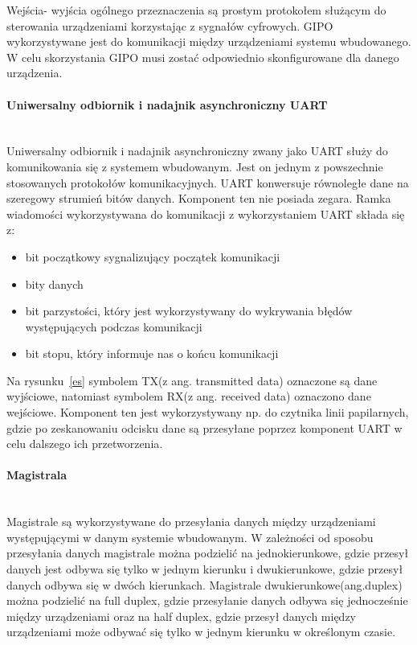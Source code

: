 \documentclass[12p]{article}
\begin{document}
Wejścia- wyjścia ogólnego przeznaczenia są prostym protokołem służącym do sterowania urządzeniami korzystając z sygnałów cyfrowych. GIPO wykorzystywane jest do komunikacji między urządzeniami systemu wbudowanego. W celu skorzystania GIPO musi zostać odpowiednio skonfigurowane dla danego urządzenia.

\paragraph{Uniwersalny odbiornik i nadajnik asynchroniczny UART} \mbox{} \\

Uniwersalny odbiornik i nadajnik asynchroniczny zwany jako UART służy do komunikowania się z systemem wbudowanym. Jest on jednym z powszechnie stosowanych protokołów komunikacyjnych. UART konwersuje równoległe dane na szeregowy strumień bitów danych. Komponent ten nie posiada zegara. Ramka wiadomości wykorzystywana do komunikacji z wykorzystaniem UART składa się z:
\begin{itemize}
\item bit początkowy sygnalizujący początek komunikacji
\item bity danych
\item bit parzystości, który jest wykorzystywany do wykrywania błędów występujących podczas komunikacji
\item bit stopu, który informuje nas o końcu komunikacji
\end{itemize} 

Na rysunku~\ref{es} symbolem TX(z ang. transmitted data) oznaczone są dane wyjściowe, natomiast symbolem RX(z ang. received data) oznaczono dane wejściowe. Komponent ten jest wykorzystywany np. do czytnika linii papilarnych, gdzie po zeskanowaniu odcisku dane są przesyłane poprzez komponent UART w celu dalszego ich przetworzenia.

\paragraph{Magistrala} \mbox{} \\

Magistrale są wykorzystywane do przesyłania danych między urządzeniami występującymi w danym systemie wbudowanym. W zależności od sposobu przesyłania danych magistrale można podzielić na jednokierunkowe, gdzie przesył danych jest odbywa się tylko w jednym kierunku i dwukierunkowe, gdzie przesył danych odbywa się w dwóch kierunkach. Magistrale dwukierunkowe(ang.duplex) można podzielić na full duplex, gdzie przesyłanie danych odbywa się jednocześnie między urządzeniami oraz na half duplex, gdzie przesył danych między urządzeniami może odbywać się tylko w jednym kierunku w określonym czasie.
\end{document}
